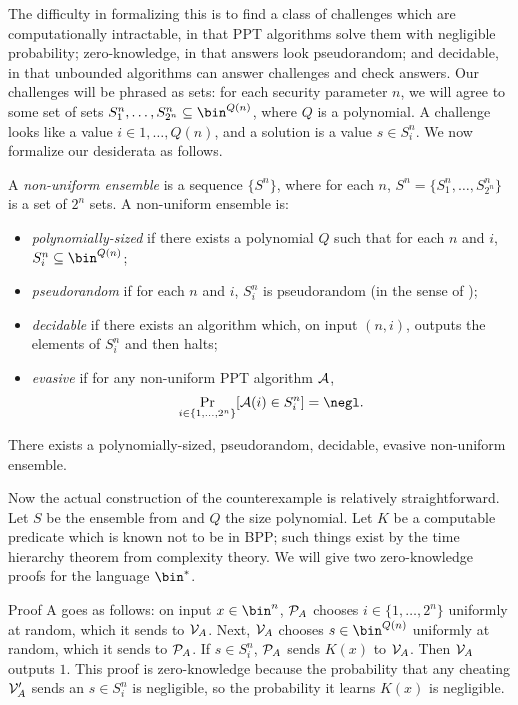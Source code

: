 The difficulty in formalizing this is to find a class of challenges which are
computationally intractable, in that PPT algorithms solve them with negligible
probability; zero-knowledge, in that answers look pseudorandom; and decidable, in
that unbounded algorithms can answer challenges and check answers. Our
challenges will be phrased as sets: for each security parameter $n$, we will
agree to some set of sets $S^n_1, \dots, S^n_{2^n}\subseteq \bin^{Q(n)}$, where
$Q$ is a polynomial. A challenge looks like a value $i\in 1, \dots, Q(n)$, and a
solution is a value $s\in S^n_i$. We now formalize our desiderata as follows.

\begin{dfn}
  A \emph{non-uniform ensemble} is a sequence $\{S^n\}$, where for each $n$,
  $S^n = \{S^n_1, \dots, S^n_{2^n}\}$ is a set of $2^n$ sets. A non-uniform
  ensemble is:
  \begin{itemize}
    \item \emph{polynomially-sized} if there exists a polynomial $Q$ such that
      for each $n$ and $i$, $S^n_i\subseteq \bin^{Q(n)}$;
    \item \emph{pseudorandom} if for each $n$ and $i$, $S^n_i$ is pseudorandom
      (in the sense of );
    \item \emph{decidable} if there exists an algorithm which, on input $(n,
      i)$, outputs the elements of $S^n_i$ and then halts;
    \item \emph{evasive} if for any non-uniform PPT algorithm $\mathcal{A}$, \[
        \Pr_{i\in\{1,\dots,2^n\}}[\cA(i)\in S^n_i] = \negl.
      \]
  \end{itemize}
\end{dfn}

\begin{thm}\label{thm:evasive-sets}
  There exists a polynomially-sized, pseudorandom, decidable, evasive
  non-uniform ensemble.
\end{thm}

Now the actual construction of the counterexample is relatively straightforward.
Let $S$ be the ensemble from 
and $Q$ the
size polynomial. Let $K$ be a computable predicate which is known not to be in
BPP; such things exist by the time hierarchy theorem from complexity theory. We
will give two zero-knowledge proofs for the language $\bin^*$.

Proof A goes as follows: on input $x\in\bin^n$, $\mathcal{P}_A$ chooses $i\in\{1,\dots,2^n\}$ uniformly
at random, which it sends to $\mathcal{V}_A$. Next, $\mathcal{V}_A$ chooses $s\in\bin^{Q(n)}$
uniformly at random, which it sends to $\mathcal{P}_A$. If $s\in S^n_i$, $\mathcal{P}_A$ sends
$K(x)$ to $\mathcal{V}_A$. Then $\mathcal{V}_A$ outputs $1$. This proof is zero-knowledge
because the probability that any cheating $\mathcal{V}'_A$ sends an $s\in S^n_i$ is
negligible, so the probability it learns $K(x)$ is negligible.

